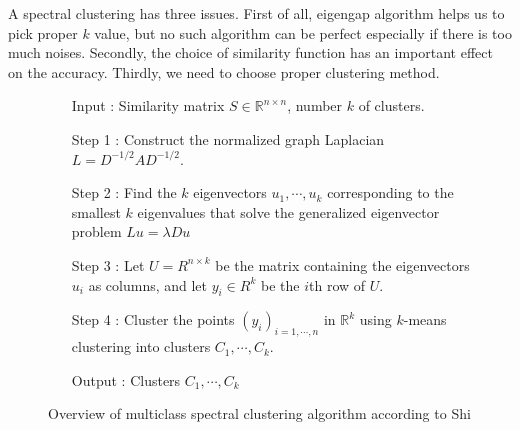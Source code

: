 A spectral clustering has three issues. 
First of all, eigengap algorithm helps us to pick proper $k$ value, but no such algorithm can be perfect especially if there is too much noises. 
Secondly, the choice of similarity function has an important effect on the accuracy. 
Thirdly, we need to choose proper clustering method. 

\begin{figure}[ht]
\begin{mdframed}
\begin{enumerate}
\item[Input] : Similarity matrix $S \in \mathbb{R}^{n \times n}$, number $k$ of clusters. 
\item[Step 1] : Construct the normalized graph Laplacian $L = D^{-1/2} A D^{-1/2}$.
\item[Step 2] : Find the $k$ eigenvectors $u_1, \cdots, u_k$ corresponding to the smallest $k$ eigenvalues that solve the generalized eigenvector problem $L u = \lambda D u$ 
\item[Step 3] : Let $U = R^{n \times k}$ be the matrix containing the eigenvectors $u_i$ as columns, and let $y_i \in R^k$ be the $i$th row of $U$.
\item[Step 4] : Cluster the points $(y_i)_{i=1,\cdots,n}$ in $\mathbb{R}^k$ using $k$-means clustering into clusters $C_1,\cdots,C_k$.
\item[Output] : Clusters $C_1, \cdots, C_k$
\end{enumerate}
\end{mdframed}
\caption{Overview of multiclass spectral clustering algorithm according to Shi}
\end{figure}

